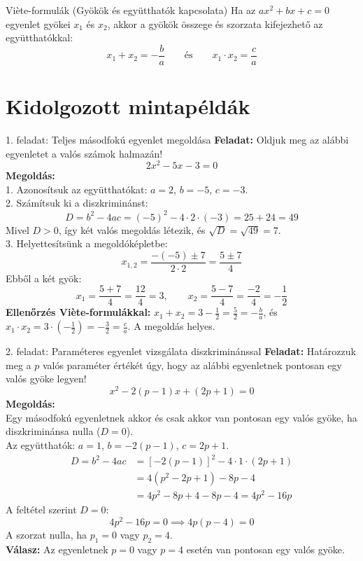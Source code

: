 \documentclass[11pt,a4paper]{article}
\begin{document}
\begin{tetelbox}{Viète-formulák (Gyökök és együtthatók kapcsolata)}
    Ha az $ax^2 + bx + c = 0$ egyenlet gyökei $x_1$ és $x_2$, akkor a gyökök összege és szorzata kifejezhető az együtthatókkal:
    \begin{equation}
        x_1 + x_2 = -\frac{b}{a} \qquad \text{és} \qquad x_1 \cdot x_2 = \frac{c}{a}
    \end{equation}
\end{tetelbox}

\section{Kidolgozott mintapéldák}

\begin{peldabox}{1. feladat: Teljes másodfokú egyenlet megoldása}
    \textbf{Feladat:} Oldjuk meg az alábbi egyenletet a valós számok halmazán!
    \[
        2x^2 - 5x - 3 = 0
    \]
    \textbf{Megoldás:}\\
    1. Azonosítsuk az együtthatókat: $a = 2$, $b = -5$, $c = -3$.\\
    2. Számítsuk ki a diszkriminánst:
    \[
        D = b^2 - 4ac = (-5)^2 - 4 \cdot 2 \cdot (-3) = 25 + 24 = 49
    \]
    Mivel $D > 0$, így két valós megoldás létezik, és $\sqrt{D} = \sqrt{49} = 7$.\\
    3. Helyettesítsünk a megoldóképletbe:
    \[
        x_{1,2} = \frac{-(-5) \pm 7}{2 \cdot 2} = \frac{5 \pm 7}{4}
    \]
    Ebből a két gyök:
    \[
        x_1 = \frac{5 + 7}{4} = \frac{12}{4} = 3, \qquad x_2 = \frac{5 - 7}{4} = \frac{-2}{4} = -\frac{1}{2}
    \]
    \textbf{Ellenőrzés Viète-formulákkal:}
    $x_1 + x_2 = 3 - \frac{1}{2} = \frac{5}{2} = -\frac{b}{a}$, és $x_1 \cdot x_2 = 3 \cdot \left(-\frac{1}{2}\right) = -\frac{3}{2} = \frac{c}{a}$. A megoldás helyes.
\end{peldabox}

\begin{peldabox}{2. feladat: Paraméteres egyenlet vizsgálata diszkriminánssal}
    \textbf{Feladat:} Határozzuk meg a $p$ valós paraméter értékét úgy, hogy az alábbi egyenletnek pontosan egy valós gyöke legyen!
    \[
        x^2 - 2(p - 1)x + (2p + 1) = 0
    \]
    \textbf{Megoldás:}\\
    Egy másodfokú egyenletnek akkor és csak akkor van pontosan egy valós gyöke, ha diszkriminánsa nulla ($D = 0$).\\
    Az együtthatók: $a = 1$, $b = -2(p-1)$, $c = 2p + 1$.
    \begin{align*}
        D = b^2 - 4ac &= \left[-2(p-1)\right]^2 - 4 \cdot 1 \cdot (2p + 1) \\
        &= 4(p^2 - 2p + 1) - 8p - 4 \\
        &= 4p^2 - 8p + 4 - 8p - 4 = 4p^2 - 16p
    \end{align*}
    A feltétel szerint $D = 0$:
    \[
        4p^2 - 16p = 0 \implies 4p(p - 4) = 0
    \]
    A szorzat nulla, ha $p_1 = 0$ vagy $p_2 = 4$.\\
    \textbf{Válasz:} Az egyenletnek $p = 0$ vagy $p = 4$ esetén van pontosan egy valós gyöke.
\end{peldabox}
\end{document}
